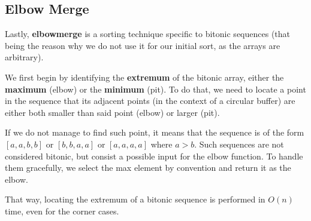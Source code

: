 \documentclass[12pt]{report}
\begin{document}
        \subsection{Elbow Merge}
        
        Lastly,  \textbf{elbowmerge} is a sorting technique specific to bitonic sequences (that being the reason why we do not use it for our initial sort, as the arrays are arbitrary). 
        
        We first begin by identifying the \textbf{extremum} of the bitonic array, either the \textbf{maximum} (elbow) or the \textbf{minimum} (pit). To do that, we need to locate a point in the sequence that its adjacent points (in the context of a circular buffer) are either both smaller than said point (elbow) or larger (pit). 
        
        If we do not manage to find such point, it means that the sequence is of the form $[a, a, b, b]$ or $[b, b, a, a]$ or $[a, a, a, a]$ where $a>b$. Such sequences are not considered bitonic, but consist a possible input for the elbow function. To handle them gracefully, we select the max element by convention and return it as the elbow. 
        
        That way, locating the extremum of a bitonic sequence is performed in $O(n)$ time, even for the corner cases.
        \newpage
\end{document}
